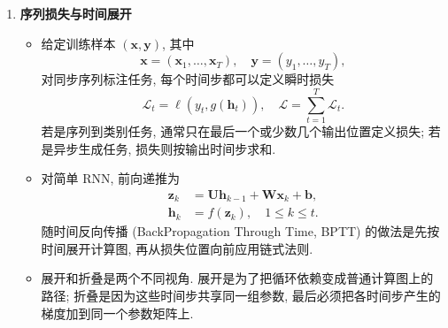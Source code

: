\documentclass{../nndlcourse}
\begin{document}
\begin{enumerate}
\item \textbf{序列损失与时间展开}
  \begin{itemize}
    \item 给定训练样本 $(\boldsymbol{x},\boldsymbol{y})$, 其中
    \begin{equation*}
      \boldsymbol{x} = (\boldsymbol{x}_1,\ldots,\boldsymbol{x}_T), \quad
      \boldsymbol{y} = (y_1,\ldots,y_T),
    \end{equation*}
    对同步序列标注任务, 每个时间步都可以定义瞬时损失
    \begin{equation*}
      \mathcal{L}_t = \ell\left(y_t, g(\boldsymbol{h}_t)\right), \quad
      \mathcal{L} = \sum_{t=1}^{T}\mathcal{L}_t.
    \end{equation*}
    若是序列到类别任务, 通常只在最后一个或少数几个输出位置定义损失; 若是异步生成任务, 损失则按输出时间步求和.
    \item 对简单 RNN, 前向递推为
    \begin{align*}
      \boldsymbol{z}_k &= \boldsymbol{U}\boldsymbol{h}_{k-1} + \boldsymbol{W}\boldsymbol{x}_k + \boldsymbol{b}, \\
      \boldsymbol{h}_k &= f(\boldsymbol{z}_k), \quad 1 \le k \le t.
    \end{align*}
    随时间反向传播 (BackPropagation Through Time, BPTT) 的做法是先按时间展开计算图, 再从损失位置向前应用链式法则.
    \item 展开和折叠是两个不同视角. 展开是为了把循环依赖变成普通计算图上的路径; 折叠是因为这些时间步共享同一组参数, 最后必须把各时间步产生的梯度加到同一个参数矩阵上.
  \end{itemize}


\end{enumerate}
\end{document}
